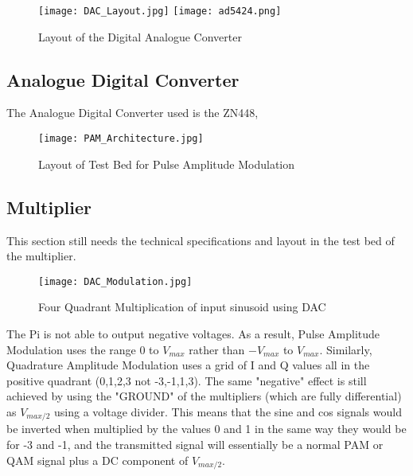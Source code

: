 \documentclass[../main.tex]{subfiles}
\begin{document}
\begin{figure}[ht]
	\centering
	\texttt{[image: DAC\_Layout.jpg]}
	\texttt{[image: ad5424.png]}
	\caption{Layout of the Digital Analogue Converter}
	\label{fig_DAC Layout}
\end{figure}

\subsection{Analogue Digital Converter}

The Analogue Digital Converter used is the ZN448, 

\begin{figure}[ht]
	\centering
	\texttt{[image: PAM\_Architecture.jpg]}
	\caption{Layout of Test Bed for Pulse Amplitude Modulation}
\end{figure}

\subsection{Multiplier} \label{sec_Multiplier}

This section still needs the technical specifications and layout in the test bed of the multiplier.


\begin{figure}[ht]
	\centering
	\texttt{[image: DAC\_Modulation.jpg]}
	\caption{Four Quadrant Multiplication of input sinusoid using DAC}
	\label{fig_}
\end{figure}

The Pi is not able to output negative voltages.
As a result, Pulse Amplitude Modulation uses the range $0$ to $V_{max}$ rather than $-V_{max}$ to $V_{max}$.
Similarly, Quadrature Amplitude Modulation uses a grid of I and Q values all in the positive quadrant (0,1,2,3 not -3,-1,1,3).
The same "negative" effect is still achieved by using the "GROUND" of the multipliers (which are fully differential)
as $V_{max/2}$ using a voltage divider.
This means that the sine and cos signals would be inverted when multiplied by the values 0 and 1 in the same way they would be for -3 and -1, and the transmitted signal will essentially be a normal PAM or QAM signal plus a DC component of $V_{max/2}$.
\end{document}
